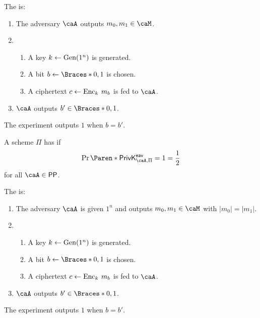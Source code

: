 \documentclass[a5paper]{article}
\begin{document}
\begin{definition*}
  The  is:
  \begin{enumerate}%
    \itemsep0em
    \item The adversary $\caA$ outputs $m_0,m_1\in\caM$.
    \item
      \begin{enumerate}%
        \itemsep0em
        \item A key $k\leftarrow\operatorname{Gen}(1^n)$ is generated.
        \item A bit $b\leftarrow \braces{0,1}$ is chosen.
        \item A ciphertext $c\leftarrow\operatorname{Enc}_k\hspace{0.23em} m_b$ is fed to $\caA$.
      \end{enumerate}
    \item $\caA$ outputs $b'\in\braces{0,1}$.
  \end{enumerate}
  The experiment outputs $1$ when $b=b'$.
\end{definition*}

\begin{definition*}
	A scheme $\Pi$ has  if
  \begin{equation*}
    \Pr\paren{\mathsf{PrivK}^{\mathsf{eav}}_{\caA,\Pi}=1}=\frac 12
  \end{equation*}
  for all $\caA\in\mathsf{PP}$.
\end{definition*}

\begin{definition*}
  The  is:
  \begin{enumerate}%
    \itemsep0em
    \item The adversary $\caA$ is given $1^n$ and outputs $m_0,m_1\in\caM$ with
      $|m_0|=|m_1|$.
    \item
      \begin{enumerate}%
        \itemsep0em
        \item A key $k\leftarrow\operatorname{Gen}(1^n)$ is generated.
        \item A bit $b\leftarrow \braces{0,1}$ is chosen.
        \item A ciphertext $c\leftarrow\operatorname{Enc}_k\hspace{0.23em} m_b$ is fed to $\caA$.
      \end{enumerate}
    \item $\caA$ outputs $b'\in\braces{0,1}$.
  \end{enumerate}
  The experiment outputs $1$ when $b=b'$.
\end{definition*}
\end{document}
